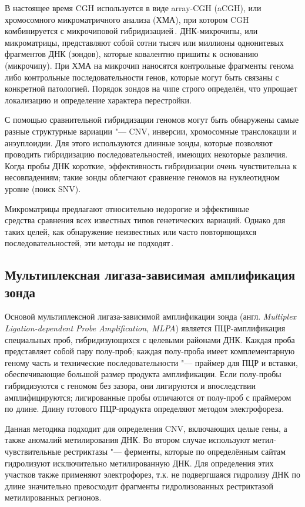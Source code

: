 \documentclass[12pt, twoside, a4paper]{article}
\newcommand{\engterm}[1]{англ. \textenglish{\textit{#1}}}
\begin{document}
В настоящее время CGH используется в виде array-CGH (aCGH), или хромосомного микроматричного анализа (ХМА), при котором CGH комбинируется с микрочиповой гибридизацией\,\cite{Theisen_2008}.
ДНК-микрочипы, или микроматрицы, представляют собой сотни тысяч или миллионы однонитевых фрагментов ДНК (зондов), которые ковалентно пришиты к основанию (микрочипу).
При ХМА на микрочип наносятся контрольные фрагменты генома либо контрольные последовательности генов, которые могут быть связаны с конкретной патологией.
Порядок зондов на чипе строго определён, что упрощает локализацию и определение характера перестройки.

С помощью сравнительной гибридизации геномов могут быть обнаружены самые разные структурные вариации "--- CNV, инверсии, хромосомные транслокации и анэуплоидии.
Для этого используются длинные зонды, которые позволяют проводить гибридизацию последовательностей, имеющих некоторые различия.
Когда пробы ДНК короткие, эффективность гибридизации очень чувствительна к несовпадениям; такие зонды облегчают сравнение геномов на нуклеотидном уровне (поиск SNV).

Микроматрицы предлагают относительно недорогие и эффективные\\средства сравнения всех известных типов генетических вариаций.
Однако для таких целей, как обнаружение неизвестных или часто повторяющихся последовательностей, эти методы не подходят\,\cite{Gresham_2008}.

\subsection*{Мультиплексная лигаза-зависимая амплификация зонда}

Основой мультиплексной лигаза-зависимой амплификации зонда (\engterm{Multiplex Ligation-dependent Probe Amplification, MLPA}) является ПЦР\hyp{}амплификация специальных проб, гибридизующихся с целевыми районами ДНК.
Каждая проба представляет собой пару полу-проб;
каждая полу-проба имеет комплементарную геному часть и технические последовательности "--- праймер для ПЦР и вставки, обеспечивающие большой размер продукта амплификации.
Если полу-пробы гибридизуются с геномом без зазора, они лигируются и впоследствии амплифицируются;
лигированные пробы отличаются от полу-проб с праймером по длине.
Длину готового ПЦР\hyp{}продукта определяют методом электрофореза.

Данная методика подходит для определения CNV, включающих целые гены, а также аномалий метилирования ДНК.
Во втором случае используют метил-чувствительные рестриктазы "--- ферменты, которые по определённым сайтам гидролизуют исключительно метилированную ДНК.
Для определения этих участков также применяют электрофорез, т.к. не подвергшаяся гидролизу ДНК по длине значительно превосходит фрагменты гидролизованных рестриктазой метилированных регионов.
\end{document}
